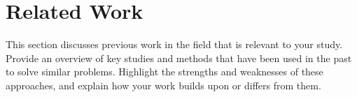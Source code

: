 \section{Related Work}

This section discusses previous work in the field that is relevant to your study. Provide an overview of key studies and methods that have been used in the past to solve similar problems. Highlight the strengths and weaknesses of these approaches, and explain how your work builds upon or differs from them.

